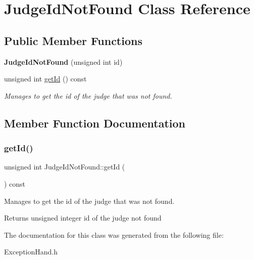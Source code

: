 \hypertarget{class_judge_id_not_found}{}\section{Judge\+Id\+Not\+Found Class Reference}
\label{class_judge_id_not_found}
\subsection*{Public Member Functions}
\begin{DoxyCompactItemize}
\item 
\mbox{\label{class_judge_id_not_found_a212c1373e661a9da9758fe2291bdc3c7}} 
{\bfseries Judge\+Id\+Not\+Found} (unsigned int id)
\item 
unsigned int \hyperlink{class_judge_id_not_found_afbc8200e1b1ba44cfe5aa97972eb67fd}{get\+Id} () const
\begin{DoxyCompactList}\small\item\em Manages to get the id of the judge that was not found. \end{DoxyCompactList}\end{DoxyCompactItemize}


\subsection{Member Function Documentation}
\mbox{\label{class_judge_id_not_found_afbc8200e1b1ba44cfe5aa97972eb67fd}} 
\subsubsection{\texorpdfstring{get\+Id()}{getId()}}
{\footnotesize\ttfamily unsigned int Judge\+Id\+Not\+Found\+::get\+Id (\begin{DoxyParamCaption}{ }\end{DoxyParamCaption}) const\hspace{0.3cm}{\ttfamily [inline]}}



Manages to get the id of the judge that was not found. 

\begin{DoxyReturn}{Returns}
unsigned integer id of the judge not found 
\end{DoxyReturn}


The documentation for this class was generated from the following file\+:\begin{DoxyCompactItemize}
\item 
Exception\+Hand.\+h\end{DoxyCompactItemize}
